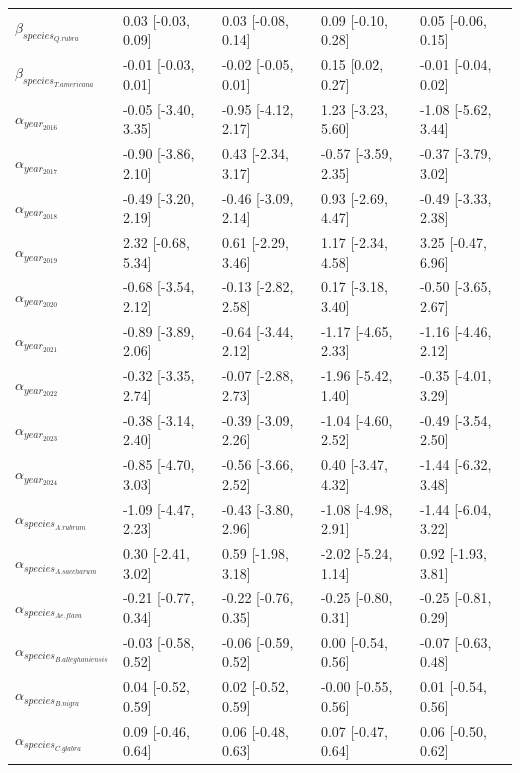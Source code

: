 \begin{table}[ht]
\begin{tabular}{lllll}
  $\beta_{species_{Q. rubra}}$ & 0.03 [-0.03, 0.09] & 0.03 [-0.08, 0.14] & 0.09 [-0.10, 0.28] & 0.05 [-0.06, 0.15] \\ 
  $\beta_{species_{T. americana}}$ & -0.01 [-0.03, 0.01] & -0.02 [-0.05, 0.01] & 0.15 [0.02, 0.27] & -0.01 [-0.04, 0.02] \\ 
  $\alpha_{year_{2016}}$ & -0.05 [-3.40, 3.35] & -0.95 [-4.12, 2.17] & 1.23 [-3.23, 5.60] & -1.08 [-5.62, 3.44] \\ 
  $\alpha_{year_{2017}}$ & -0.90 [-3.86, 2.10] & 0.43 [-2.34, 3.17] & -0.57 [-3.59, 2.35] & -0.37 [-3.79, 3.02] \\ 
  $\alpha_{year_{2018}}$ & -0.49 [-3.20, 2.19] & -0.46 [-3.09, 2.14] & 0.93 [-2.69, 4.47] & -0.49 [-3.33, 2.38] \\ 
  $\alpha_{year_{2019}}$ & 2.32 [-0.68, 5.34] & 0.61 [-2.29, 3.46] & 1.17 [-2.34, 4.58] & 3.25 [-0.47, 6.96] \\ 
  $\alpha_{year_{2020}}$ & -0.68 [-3.54, 2.12] & -0.13 [-2.82, 2.58] & 0.17 [-3.18, 3.40] & -0.50 [-3.65, 2.67] \\ 
  $\alpha_{year_{2021}}$ & -0.89 [-3.89, 2.06] & -0.64 [-3.44, 2.12] & -1.17 [-4.65, 2.33] & -1.16 [-4.46, 2.12] \\ 
  $\alpha_{year_{2022}}$ & -0.32 [-3.35, 2.74] & -0.07 [-2.88, 2.73] & -1.96 [-5.42, 1.40] & -0.35 [-4.01, 3.29] \\ 
  $\alpha_{year_{2023}}$ & -0.38 [-3.14, 2.40] & -0.39 [-3.09, 2.26] & -1.04 [-4.60, 2.52] & -0.49 [-3.54, 2.50] \\ 
  $\alpha_{year_{2024}}$ & -0.85 [-4.70, 3.03] & -0.56 [-3.66, 2.52] & 0.40 [-3.47, 4.32] & -1.44 [-6.32, 3.48] \\ 
  $\alpha_{species_{A. rubrum}}$ & -1.09 [-4.47, 2.23] & -0.43 [-3.80, 2.96] & -1.08 [-4.98, 2.91] & -1.44 [-6.04, 3.22] \\ 
  $\alpha_{species_{A. saccharum}}$ & 0.30 [-2.41, 3.02] & 0.59 [-1.98, 3.18] & -2.02 [-5.24, 1.14] & 0.92 [-1.93, 3.81] \\ 
  $\alpha_{species_{Ae. flava}}$ & -0.21 [-0.77, 0.34] & -0.22 [-0.76, 0.35] & -0.25 [-0.80, 0.31] & -0.25 [-0.81, 0.29] \\ 
  $\alpha_{species_{B. alleghaniensis}}$ & -0.03 [-0.58, 0.52] & -0.06 [-0.59, 0.52] & 0.00 [-0.54, 0.56] & -0.07 [-0.63, 0.48] \\ 
  $\alpha_{species_{B. nigra}}$ & 0.04 [-0.52, 0.59] & 0.02 [-0.52, 0.59] & -0.00 [-0.55, 0.56] & 0.01 [-0.54, 0.56] \\ 
  $\alpha_{species_{C. glabra}}$ & 0.09 [-0.46, 0.64] & 0.06 [-0.48, 0.63] & 0.07 [-0.47, 0.64] & 0.06 [-0.50, 0.62] \\ 

\end{tabular}
\end{table}
